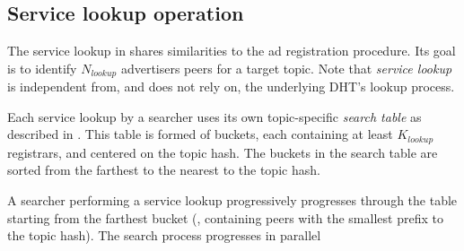 
\subsection{Service lookup operation}
\label{sec:lookup}

The service lookup in \sysname shares similarities to the ad registration procedure.
Its goal is to identify $N_\textit{lookup}$ advertisers peers for a target topic.
Note that \emph{service lookup} is independent from, and does not rely on, the underlying DHT's lookup process.

Each service lookup by a searcher uses its own topic-specific \emph{search table} as described in .
This table is formed of buckets, each containing at least $K_\textit{lookup}$  registrars, and centered on the topic hash.
The buckets in the search table are sorted from the farthest to the nearest to the topic hash.

A searcher performing a service lookup progressively progresses through the table starting from the farthest bucket (\ie, containing peers with the smallest prefix to the topic hash).
The search process progresses in parallel 

